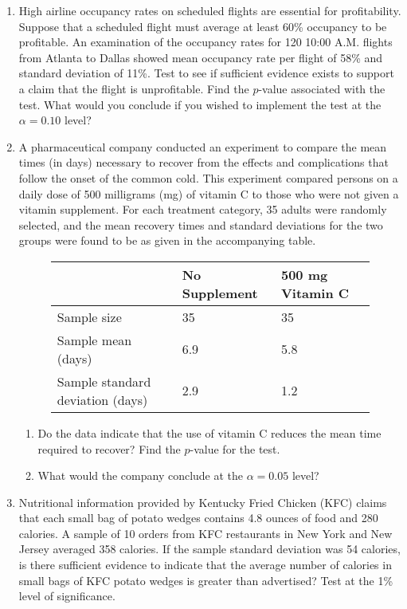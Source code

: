 \documentclass[12pt]{article}
\begin{document}
\begin{enumerate}
\item High airline occupancy rates on scheduled flights are essential for profitability. Suppose that a scheduled flight must average at least 60\% occupancy to be profitable. An examination of the occupancy rates for 120 10:00 A.M. flights from Atlanta to Dallas showed mean occupancy rate per flight of 58\% and standard deviation of 11\%. Test to see if sufficient evidence exists to support a claim that the flight is unprofitable. Find the $p$-value associated with the test. What would you conclude if you wished to implement the test at the $\alpha = 0.10$ level?

\item A pharmaceutical company conducted an experiment to compare the mean times (in days) necessary to recover from the effects and complications that follow the onset of the common cold. This experiment compared persons on a daily dose of 500 milligrams (mg) of vitamin C to those who were not given a vitamin supplement. For each treatment category, 35 adults were randomly selected, and the mean recovery times and standard deviations for the two groups were found to be as given in the accompanying table.
\begin{figure}[H]
\centering
\begin{tabular}{l@{\hskip 2cm}l@{\hskip 2cm}l}
\toprule
& No Supplement & 500 mg Vitamin C \\
\midrule
Sample size & 35 & 35 \\
Sample mean (days) & 6.9 & 5.8 \\
Sample standard deviation (days) & 2.9 & 1.2 \\
\bottomrule
\end{tabular}
\end{figure} 
\begin{enumerate}
\item Do the data indicate that the use of vitamin C reduces the mean time required to recover? Find the $p$-value for the test.
\item What would the company conclude at the $\alpha = 0.05$ level?
\end{enumerate}

\item Nutritional information provided by Kentucky Fried Chicken (KFC) claims that each small bag of potato wedges contains 4.8 ounces of food and 280 calories. A sample of 10 orders from KFC restaurants in New York and New Jersey averaged 358 calories.
If the sample standard deviation was 54 calories, is there sufficient evidence to indicate that the average number of calories in small bags of KFC potato wedges is greater than advertised? Test at the 1\% level of significance.


\end{enumerate}
\end{document}
